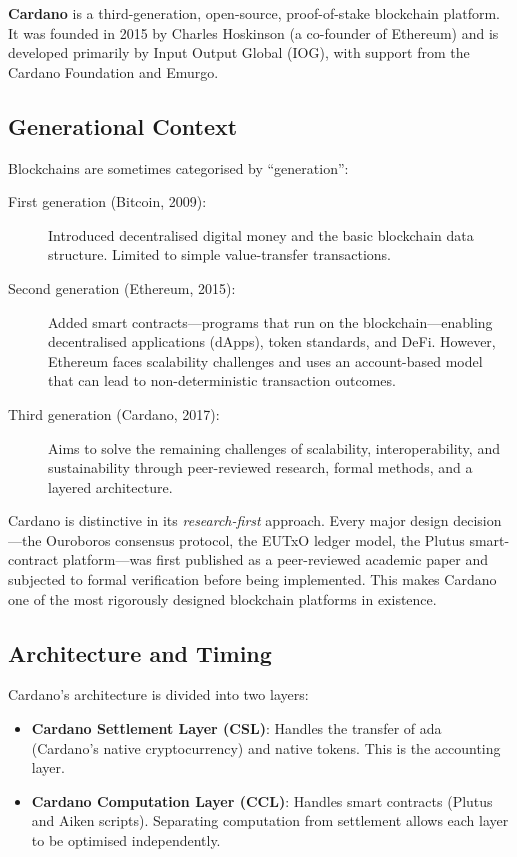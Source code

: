 \textbf{Cardano} is a third-generation, open-source, proof-of-stake
blockchain platform.  It was founded in 2015 by Charles Hoskinson (a
co-founder of Ethereum) and is developed primarily by Input Output Global
(IOG), with support from the Cardano Foundation and Emurgo.

\subsection{Generational Context}

Blockchains are sometimes categorised by ``generation'':

\begin{description}
  \item[First generation (Bitcoin, 2009):] Introduced decentralised digital
    money and the basic blockchain data structure.  Limited to simple
    value-transfer transactions.
  \item[Second generation (Ethereum, 2015):] Added smart contracts---programs
    that run on the blockchain---enabling decentralised applications (dApps),
    token standards, and DeFi.  However, Ethereum faces scalability
    challenges and uses an account-based model that can lead to
    non-deterministic transaction outcomes.
  \item[Third generation (Cardano, 2017):] Aims to solve the remaining
    challenges of scalability, interoperability, and sustainability through
    peer-reviewed research, formal methods, and a layered architecture.
\end{description}

Cardano is distinctive in its \emph{research-first} approach.  Every major
design decision---the Ouroboros consensus protocol, the EUTxO ledger model,
the Plutus smart-contract platform---was first published as a peer-reviewed
academic paper and subjected to formal verification before being implemented.
This makes Cardano one of the most rigorously designed blockchain platforms
in existence.

\subsection{Architecture and Timing}

Cardano's architecture is divided into two layers:

\begin{itemize}
  \item \textbf{Cardano Settlement Layer (CSL)}: Handles the transfer of ada
        (Cardano's native cryptocurrency) and native tokens.  This is the
        accounting layer.
  \item \textbf{Cardano Computation Layer (CCL)}: Handles smart contracts
        (Plutus and Aiken scripts).  Separating computation from settlement
        allows each layer to be optimised independently.
\end{itemize}

